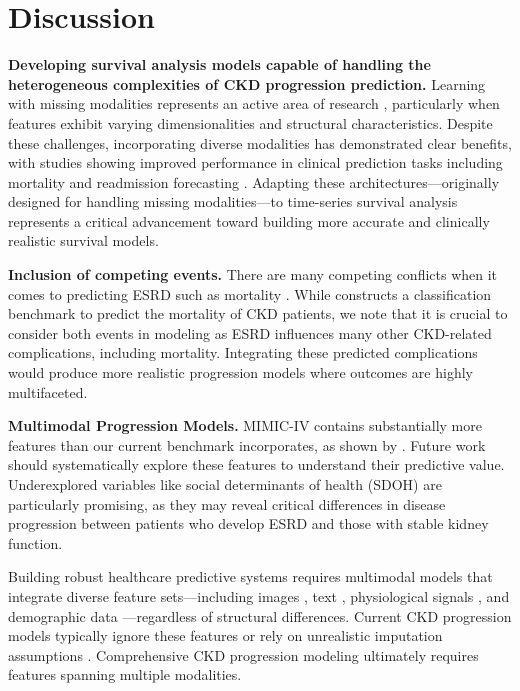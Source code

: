 \section{Discussion}
\textbf{Developing survival analysis models capable of handling the heterogeneous complexities of CKD progression prediction.} Learning with missing modalities represents an active area of research \citep{wu2024deepmultimodallearningmissing_survey}, particularly when features exhibit varying dimensionalities and structural characteristics. Despite these challenges, incorporating diverse modalities has demonstrated clear benefits, with studies showing improved performance in clinical prediction tasks including mortality and readmission forecasting \citep{wu2024multimodal_missing_modalities}. Adapting these architectures—originally designed for handling missing modalities—to time-series survival analysis represents a critical advancement toward building more accurate and clinically realistic survival models. 

\textbf{Inclusion of competing events.} There are many competing conflicts when it comes to predicting ESRD such as mortality \citep{hsu2017statistical_competing_events_CKD}. While  \citep{li2023machine_classification} constructs a classification benchmark to predict the mortality of CKD patients, we note that it is crucial to consider both events in modeling as ESRD influences many other CKD-related complications, including mortality. Integrating these predicted complications would produce more realistic progression models where outcomes are highly multifaceted. 

\textbf{Multimodal Progression Models.} MIMIC-IV \citep{johnson2023mimic_ehr} contains substantially more features than our current benchmark incorporates, as shown by \citep{dana2024integratedmachinelearningsurvival_feature_analysis}. Future work should systematically explore these features to understand their predictive value. Underexplored variables like social determinants of health (SDOH) \citep{chen2020social_SDOH} are particularly promising, as they may reveal critical differences in disease progression between patients who develop ESRD and those with stable kidney function.

Building robust healthcare predictive systems requires multimodal models that integrate diverse feature sets—including images \citep{johnson2019mimiccxrjpglargepubliclyavailable}, text \citep{johnson2023mimic_ehr}, physiological signals \citep{jing2018rapid_physiological_signals}, and demographic data \citep{pollard2018eicu_demographic}—regardless of structural differences. Current CKD progression models typically ignore these features or rely on unrealistic imputation assumptions \citep{swain2023robust_classifier_imputation_CKD}. Comprehensive CKD progression modeling ultimately requires features spanning multiple modalities.

 